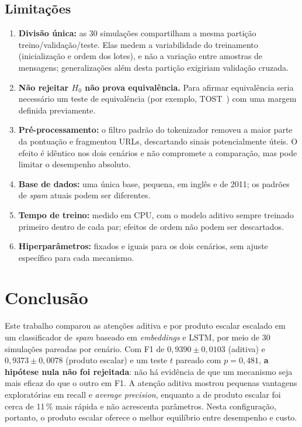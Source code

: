 \documentclass[conference]{IEEEtran}
\begin{document}
\subsection{Limitações}
\begin{enumerate}
  \item \textbf{Divisão única:} as 30 simulações compartilham a mesma partição treino/validação/teste. Elas medem a variabilidade do treinamento (inicialização e ordem dos lotes), e não a variação entre amostras de mensagens; generalizações além desta partição exigiriam validação cruzada.
  \item \textbf{Não rejeitar $H_0$ não prova equivalência.} Para afirmar equivalência seria necessário um teste de equivalência (por exemplo, TOST~\cite{lakens2017}) com uma margem definida previamente.
  \item \textbf{Pré-processamento:} o filtro padrão do tokenizador removeu a maior parte da pontuação e fragmentou URLs, descartando sinais potencialmente úteis. O efeito é idêntico nos dois cenários e não compromete a comparação, mas pode limitar o desempenho absoluto.
  \item \textbf{Base de dados:} uma única base, pequena, em inglês e de 2011; os padrões de \textit{spam} atuais podem ser diferentes.
  \item \textbf{Tempo de treino:} medido em CPU, com o modelo aditivo sempre treinado primeiro dentro de cada par; efeitos de ordem não podem ser descartados.
  \item \textbf{Hiperparâmetros:} fixados e iguais para os dois cenários, sem ajuste específico para cada mecanismo.
\end{enumerate}

\section{Conclusão}
\label{sec:conclusao}

Este trabalho comparou as atenções aditiva e por produto escalar escalado em um classificador de \textit{spam} baseado em \textit{embeddings} e LSTM, por meio de 30 simulações pareadas por cenário. Com F1 de $0,9390 \pm 0,0103$ (aditiva) e $0,9373 \pm 0,0078$ (produto escalar) e um teste $t$ pareado com $p = 0,481$, \textbf{a hipótese nula não foi rejeitada}: não há evidência de que um mecanismo seja mais eficaz do que o outro em F1. A atenção aditiva mostrou pequenas vantagens exploratórias em recall e \textit{average precision}, enquanto a de produto escalar foi cerca de 11\,\% mais rápida e não acrescenta parâmetros. Nesta configuração, portanto, o produto escalar oferece o melhor equilíbrio entre desempenho e custo.
\end{document}
